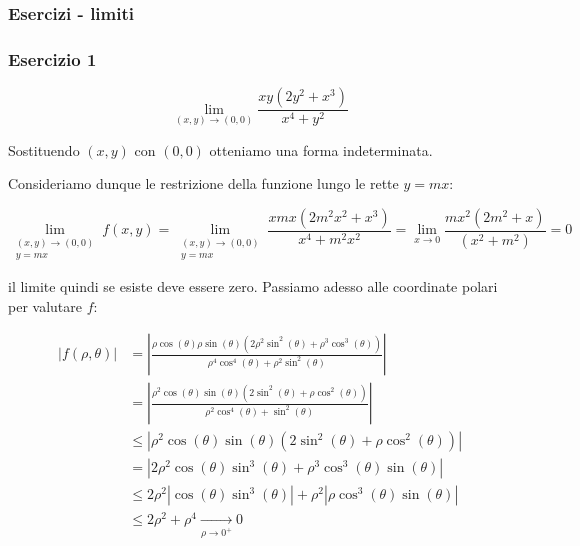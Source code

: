\pagebreak
\subsubsection{Esercizi {-} limiti}

\subsubsection*{Esercizio 1}

\[
    \lim_{ (x,y) \to (0,0) } \frac{xy(2y^{2}+x^{3})}{x^{4}+y^{2}}
\]

Sostituendo \((x,y)\) con \((0,0)\) otteniamo una forma indeterminata.

Consideriamo dunque le restrizione della funzione lungo le rette \(y=mx\):

\[
    \lim_{\begin{smallmatrix}(x,y) \to (0,0) \\ y=mx\end{smallmatrix}} f(x,y) = \lim_{\begin{smallmatrix}(x,y) \to (0,0) \\ y=mx\end{smallmatrix}} \frac{xmx(2m^{2}x^{2}+x^{3})}{x^{4}+m^{2}x^{2}}= \lim_{ x \to 0 } \frac{mx^{2}(2m^{2}+x)}{(x^{2}+m^{2})} = 0
\]

il limite quindi se esiste deve essere zero. Passiamo adesso alle coordinate polari per valutare \(f\):

\begin{spreadlines}{3mm}
    \begin{align*}
        \left|f(\rho, \theta)\right| & = \left|\frac{\rho\cos(\theta) \rho\sin(\theta) (2\rho^{2}\sin^{2}(\theta)+\rho^{3}\cos^{3}(\theta))}{\rho^{4}\cos^{4}(\theta)+\rho^{2}\sin^{2}(\theta)}\right| \\
                                     & = \left|\frac{\rho^{2}\cos(\theta) \sin(\theta) (2\sin^{2}(\theta)+\rho \cos^{2}(\theta))}{\rho^{2}\cos^{4}(\theta)+\sin^{2}(\theta)} \right|                   \\
                                     & \le \left|\rho^{2}\cos(\theta) \sin(\theta) (2\sin^{2}(\theta)+\rho \cos^{2}(\theta))\right|                                                                    \\
                                     & = \left|2\rho^{2}\cos(\theta)\sin^3(\theta) + \rho^{3}\cos^3(\theta)\sin(\theta)\right|                                                                         \\
                                     & \le 2\rho^2|\cos(\theta)\sin^3(\theta)| + \rho^2|\rho\cos^3(\theta)\sin(\theta)|                                                                                \\
                                     & \le 2\rho^2 + \rho^4 \xrightarrow[\rho \to 0^+]{} 0
    \end{align*}
\end{spreadlines}

